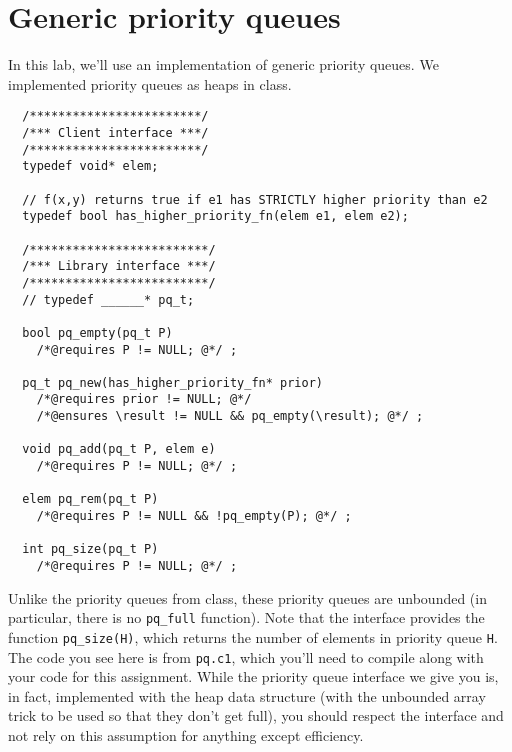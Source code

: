 \section*{Generic priority queues}

In this lab, we'll use an implementation of generic priority queues.
We implemented priority queues as heaps in class.

\begin{lstlisting}
  /************************/
  /*** Client interface ***/
  /************************/
  typedef void* elem;

  // f(x,y) returns true if e1 has STRICTLY higher priority than e2
  typedef bool has_higher_priority_fn(elem e1, elem e2);

  /*************************/
  /*** Library interface ***/
  /*************************/
  // typedef ______* pq_t;

  bool pq_empty(pq_t P)
    /*@requires P != NULL; @*/ ;

  pq_t pq_new(has_higher_priority_fn* prior)
    /*@requires prior != NULL; @*/
    /*@ensures \result != NULL && pq_empty(\result); @*/ ;

  void pq_add(pq_t P, elem e)
    /*@requires P != NULL; @*/ ;

  elem pq_rem(pq_t P)
    /*@requires P != NULL && !pq_empty(P); @*/ ;

  int pq_size(pq_t P)
    /*@requires P != NULL; @*/ ;

\end{lstlisting}

Unlike the priority queues from class, these priority queues are
unbounded (in particular, there is no \lstinline'pq_full' function).
Note that the interface provides the function \lstinline'pq_size(H)',
which returns the number of elements in priority queue \lstinline'H'.
The code you see here is from \lstinline'pq.c1', which you'll need to
compile along with your code for this assignment. While the priority
queue interface we give you is, in fact, implemented with the heap
data structure (with the unbounded array trick to be used so that they
don't get full), you should respect the interface and not rely on this
assumption for anything except efficiency.

\onePT